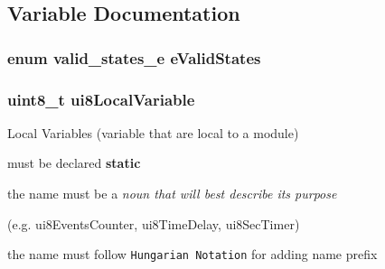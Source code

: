 \subsection{Variable Documentation}
\subsubsection[{e\-Valid\-States}]{\setlength{\rightskip}{0pt plus 5cm}enum {\bf valid\-\_\-states\-\_\-e} e\-Valid\-States}\label{____lib__template_8c_a6baad34712404c0dee14696f3c26612d}
\subsubsection[{ui8\-Local\-Variable}]{\setlength{\rightskip}{0pt plus 5cm}uint8\-\_\-t ui8\-Local\-Variable\hspace{0.3cm}{\ttfamily [static]}}\label{____lib__template_8c_a06262aab6d307fdbaea9efc5a1d9e9d9}


Local Variables (variable that are local to a module) 


\begin{DoxyItemize}
\item must be declared {\bfseries static}
\item the name must be a {\itshape noun that will best describe its purpose}
\begin{DoxyItemize}
\item (e.\-g. ui8\-Events\-Counter, ui8\-Time\-Delay, ui8\-Sec\-Timer)
\end{DoxyItemize}
\item the name must follow {\tt Hungarian Notation} for adding name prefix
\end{DoxyItemize}

